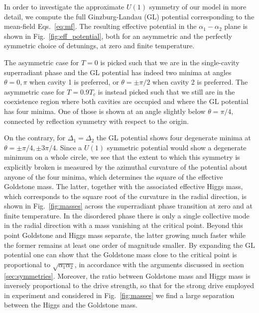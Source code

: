 \documentclass[12pt]{iopart}
\begin{document}
In order to investigate the approximate $U(1)$ symmetry of our model in more detail,
we compute the full Ginzburg-Landau (GL) potential corresponding to the
mean-field Eqs.~\eqref{eq:mf}. The resulting effective potential in the
$\alpha_1-\alpha_2$ plane is shown in Fig.~\ref{fig:eff_potential}, 
both for an asymmetric and the perfectly symmetric choice of
detunings, at zero and finite temperature. 

The asymmetric case for $T=0$ is picked such that we are in the
single-cavity superradiant phase and the GL potential has indeed two minima at angles $\theta=0,\pi$ when cavity 1 is preferred,
or $\theta=\pm\pi/2$ when cavity 2 is preferred. The asymmetric case
for $T=0.9T_c$ is instead picked such that we still are in the
coexistence region where both cavities are occupied and where the GL
potential has four minima. One of those is shown at an angle slightly
below $\theta=\pi/4$, connected by reflection symmetry with respect to
the origin.

On the contrary, for $\Delta_1=\Delta_2$ the GL potential shows four degenerate
minima at $\theta=\pm\pi/4,\pm 3\pi/4$. Since a $U(1)$ symmetric
potential would show a degenerate minimum on a whole circle, we see
that the extent to which this symmetry is explicitly broken is
measured by the azimuthal curvature of the potential about anyone
of the four minima, which determines the square of the effective Goldstone mass. The latter,
together with the associated effective Higgs mass, which corresponds to the square root of the curvature in
the radial direction, is shown in Fig.~\ref{fig:masses} across the
superradiant phase transition at zero and at finite temperature.  
In the disordered phase there is only a single collective mode in the
radial direction with a mass vanishing at the critical point. Beyond
this point Goldstone and Higgs mass separate, the latter growing much
faster while the former remains at least one order of magnitude
smaller. By expanding the GL potential one can show that the Goldstone
mass close to the critical point is proportional to
$\sqrt{\alpha_1\alpha_2}$, in accordance with the arguments discussed in
section \ref{sec:symmetries}.
Moreover, the ratio between Goldstone mass and Higgs mass is inversely proportional to the drive
strength, so that for the strong drive employed in experiment and considered in
Fig.~\ref{fig:masses} we find a large separation between the Higgs and
the Goldstone mass. 
\end{document}
